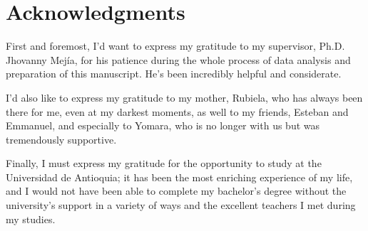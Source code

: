 \chapter*{Acknowledgments}

First and foremost, I'd want to express my gratitude to my supervisor, Ph.D. Jhovanny Mejía, for his patience during the whole process of data analysis and preparation of this manuscript. He's been incredibly helpful and considerate.

I'd also like to express my gratitude to my mother, Rubiela, who has always been there for me, even at my darkest moments, as well to my friends, Esteban and Emmanuel, and especially to Yomara, who is no longer with us but was tremendously supportive.

Finally, I must express my gratitude for the opportunity to study at the Universidad de Antioquia; it has been the most enriching experience of my life, and I would not have been able to complete my bachelor's degree without the university's support in a variety of ways and the excellent teachers I met during my studies.